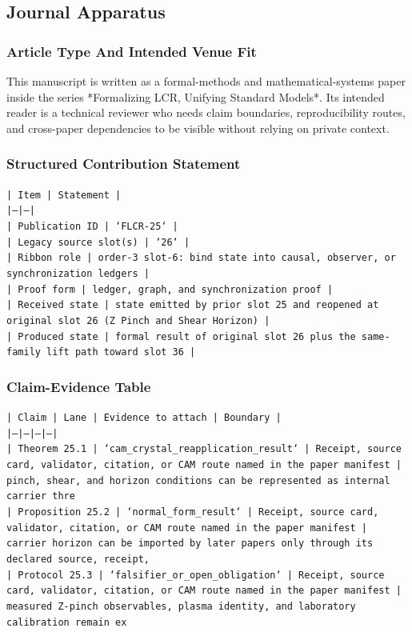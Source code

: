 \documentclass[11pt]{article}
\begin{document}
\subsection*{Journal Apparatus}

\subsubsection*{Article Type And Intended Venue Fit}

This manuscript is written as a formal-methods and mathematical-systems paper
inside the series *Formalizing LCR, Unifying Standard Models*. Its intended
reader is a technical reviewer who needs claim boundaries, reproducibility
routes, and cross-paper dependencies to be visible without relying on private
context.

\subsubsection*{Structured Contribution Statement}

\noindent\texttt{| Item | Statement |}\\
\noindent\texttt{|---|---|}\\
\noindent\texttt{| Publication ID | `FLCR-25` |}\\
\noindent\texttt{| Legacy source slot(s) | `26` |}\\
\noindent\texttt{| Ribbon role | order-3 slot-6: bind state into causal, observer, or synchronization ledgers |}\\
\noindent\texttt{| Proof form | ledger, graph, and synchronization proof |}\\
\noindent\texttt{| Received state | state emitted by prior slot 25 and reopened at original slot 26 (Z Pinch and Shear Horizon) |}\\
\noindent\texttt{| Produced state | formal result of original slot 26 plus the same-family lift path toward slot 36 |}\\

\subsubsection*{Claim-Evidence Table}

\noindent\texttt{| Claim | Lane | Evidence to attach | Boundary |}\\
\noindent\texttt{|---|---|---|---|}\\
\noindent\texttt{| Theorem 25.1 | `cam\_crystal\_reapplication\_result` | Receipt, source card, validator, citation, or CAM route named in the paper manifest | pinch, shear, and horizon conditions can be represented as internal carrier thre}\\
\noindent\texttt{| Proposition 25.2 | `normal\_form\_result` | Receipt, source card, validator, citation, or CAM route named in the paper manifest | carrier horizon can be imported by later papers only through its declared source, receipt,}\\
\noindent\texttt{| Protocol 25.3 | `falsifier\_or\_open\_obligation` | Receipt, source card, validator, citation, or CAM route named in the paper manifest | measured Z-pinch observables, plasma identity, and laboratory calibration remain ex}\\
\end{document}
